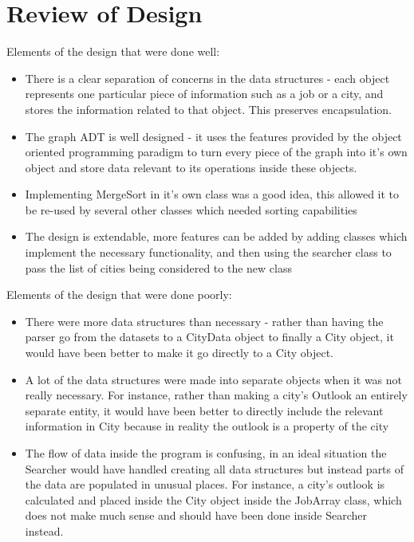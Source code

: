 \documentclass[12pt,fleqn]{article}
\begin{document}
\section*{Review of Design}
Elements of the design that were done well:\\
\begin{itemize}
\item There is a clear separation of concerns in the data structures - each object represents one particular piece of information such as a job or a city, and stores the information related to that object. This preserves encapsulation.
\item The graph ADT is well designed - it uses the features provided by the object oriented programming paradigm to turn every piece of the graph into it’s own object and store data relevant to its operations inside these objects.
\item Implementing MergeSort in it’s own class was a good idea, this allowed it to be re-used by several other classes which needed sorting capabilities
\item The design is extendable, more features can be added by adding classes which implement the necessary functionality, and then using the searcher class to pass the list of cities being considered to the new class
\end{itemize}

Elements of the design that were done poorly: \\
\begin{itemize}
\item There were more data structures than necessary - rather than having the parser go from the datasets to a CityData object to finally a City object, it would have been better to make it go directly to a City object.
\item A lot of the data structures were made into separate objects when it was not really necessary. For instance, rather than making a city’s Outlook an entirely separate entity, it would have been better to directly include the relevant information in City because in reality the outlook is a property of the city
\item The flow of data inside the program is confusing, in an ideal situation the Searcher would have handled creating all data structures but instead parts of the data are populated in unusual places. For instance, a city’s outlook is calculated and placed inside the City object inside the JobArray class, which does not make much sense and should have been done inside Searcher instead.
\end {itemize}
\end{document}
